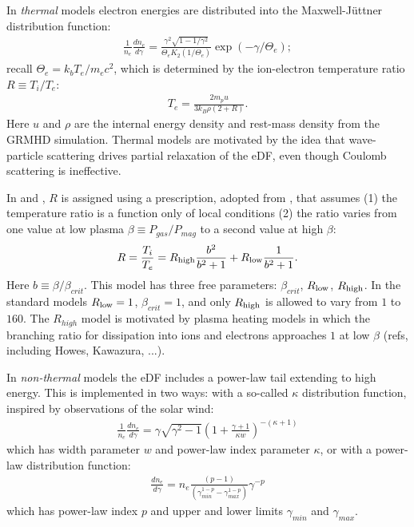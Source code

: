 
In {\it thermal} models electron energies are distributed into the Maxwell-J{\"u}ttner distribution function:
\begin{align}
\frac{1}{n_e}\frac{dn_e}{d\gamma}= \frac{\gamma^2 \sqrt{1-1/\gamma^2}} {\Theta_e K_2(1/\Theta_e)} \exp (-\gamma/\Theta_e);
\end{align}
recall $\Theta_e=k_b T_e/m_e c^2$, which is determined by the ion-electron temperature ratio $R \equiv T_i/T_e$:
\begin{align}
T_e=\frac{2 m_p u}{3 k_B \rho (2+R)}.
\end{align}
Here $u$ and $\rho$ are the internal energy density and rest-mass density from the GRMHD simulation.  Thermal models are motivated by the idea that wave-particle scattering drives partial relaxation of the eDF, even though Coulomb scattering is ineffective.

In \cite{M87PaperV} and \cite{M87PaperVIII}, $R$ is assigned using a prescription, adopted from \cite{2016A&A...586A..38M}, that assumes (1) the temperature ratio is a function only of local conditions (2) the ratio varies from one value at low plasma $\beta \equiv P_{gas}/P_{mag}$ to a second value at high $\beta$:
\begin{equation}
R = \frac{T_i}{T_e} = R_{\rm high} \frac{b^2}{b^2+1} + R_{\rm low} \frac{1}{b^2+1}.
\end{equation}
Here $b \equiv \beta/\beta_{crit}$. This model has three free parameters: $\beta_{crit}$, $R_{\rm low}$, $R_{\rm high}$.  In the standard models $R_{\rm low} = 1$, $\beta_{crit} = 1$, and only $R_{\rm high}$ is allowed to vary from $1$ to $160$.  The $R_{high}$ model is motivated by plasma heating models in which the branching ratio for dissipation into ions and electrons approaches $1$ at low $\beta$ (refs, including Howes, Kawazura, ...).

In {\it non-thermal} models the eDF includes a power-law tail extending to high energy.  This is implemented in two ways: with a so-called $\kappa$ distribution function, inspired by observations of the solar wind:
\begin{align}                                           \frac{1}{n_e} \frac{d n_e}{d\gamma}= \gamma \sqrt{\gamma^2-1} \left(1+\frac{\gamma+1}{\kappa w}\right)^{-(\kappa+1)}           \end{align}
which has width parameter $w$ and power-law index parameter $\kappa$, or with a power-law distribution function:
\begin{align}
\frac{d n_e}{d\gamma} = n_e \frac{ (p-1)}{(\gamma_{min}^{1-p} - \gamma_{max}^{1-p})} \gamma^{-p}
\end{align}
which has power-law index $p$ and upper and lower limits  $\gamma_{min}$ and $\gamma_{max}$.

